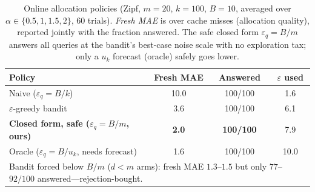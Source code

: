 \documentclass[sigconf,nonacm]{acmart}
\newcommand{\eps}{\varepsilon}
\begin{document}
\begin{table}[h]
\footnotesize
\centering
\caption{Online allocation policies (Zipf, $m=20$, $k=100$, $B=10$, averaged over $\alpha\in\{0.5,1,1.5,2\}$, $60$ trials). \emph{Fresh MAE} is over cache misses (allocation quality), reported jointly with the fraction answered. The safe closed form $\eps_q{=}B/m$ answers all queries at the bandit's best-case noise scale with no exploration tax; only a $u_k$ forecast (oracle) safely goes lower.}
\label{tab:allocation}
\begin{tabular}{l|ccc}
\toprule
Policy & Fresh MAE & Answered & $\eps$ used \\
\midrule
Naive ($\eps_q{=}B/k$) & 10.0 & 100/100 & 1.6 \\
$\eps$-greedy bandit & 3.6 & 100/100 & 6.1 \\
\textbf{Closed form, safe ($\eps_q{=}B/m$, ours)} & \textbf{2.0} & \textbf{100/100} & 7.9 \\
Oracle ($\eps_q{=}B/u_k$, needs forecast) & 1.6 & 100/100 & 10.0 \\
\midrule
\multicolumn{4}{p{0.92\columnwidth}}{\footnotesize Bandit forced below $B/m$ ($d<m$ arms): fresh MAE $1.3$--$1.5$ but only $77$--$92/100$ answered---rejection-bought.}\\
\bottomrule
\end{tabular}
\end{table}
\end{document}
